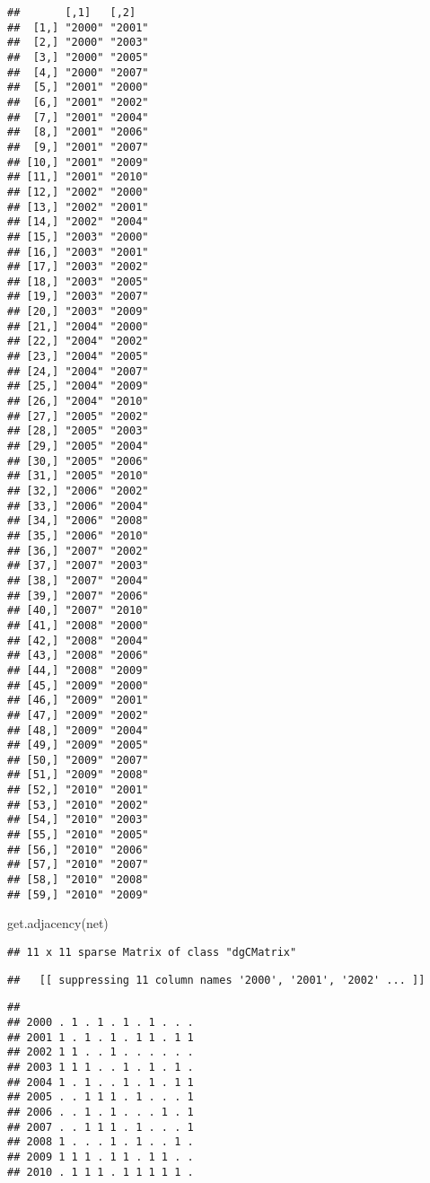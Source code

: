 \documentclass[
]{article}
\newenvironment{Shaded}{\begin{snugshade}}{\end{snugshade}}
\newcommand{\FunctionTok}[1]{\textcolor[rgb]{0.00,0.00,0.00}{#1}}
\newcommand{\NormalTok}[1]{#1}
\begin{document}
\begin{verbatim}
##       [,1]   [,2]  
##  [1,] "2000" "2001"
##  [2,] "2000" "2003"
##  [3,] "2000" "2005"
##  [4,] "2000" "2007"
##  [5,] "2001" "2000"
##  [6,] "2001" "2002"
##  [7,] "2001" "2004"
##  [8,] "2001" "2006"
##  [9,] "2001" "2007"
## [10,] "2001" "2009"
## [11,] "2001" "2010"
## [12,] "2002" "2000"
## [13,] "2002" "2001"
## [14,] "2002" "2004"
## [15,] "2003" "2000"
## [16,] "2003" "2001"
## [17,] "2003" "2002"
## [18,] "2003" "2005"
## [19,] "2003" "2007"
## [20,] "2003" "2009"
## [21,] "2004" "2000"
## [22,] "2004" "2002"
## [23,] "2004" "2005"
## [24,] "2004" "2007"
## [25,] "2004" "2009"
## [26,] "2004" "2010"
## [27,] "2005" "2002"
## [28,] "2005" "2003"
## [29,] "2005" "2004"
## [30,] "2005" "2006"
## [31,] "2005" "2010"
## [32,] "2006" "2002"
## [33,] "2006" "2004"
## [34,] "2006" "2008"
## [35,] "2006" "2010"
## [36,] "2007" "2002"
## [37,] "2007" "2003"
## [38,] "2007" "2004"
## [39,] "2007" "2006"
## [40,] "2007" "2010"
## [41,] "2008" "2000"
## [42,] "2008" "2004"
## [43,] "2008" "2006"
## [44,] "2008" "2009"
## [45,] "2009" "2000"
## [46,] "2009" "2001"
## [47,] "2009" "2002"
## [48,] "2009" "2004"
## [49,] "2009" "2005"
## [50,] "2009" "2007"
## [51,] "2009" "2008"
## [52,] "2010" "2001"
## [53,] "2010" "2002"
## [54,] "2010" "2003"
## [55,] "2010" "2005"
## [56,] "2010" "2006"
## [57,] "2010" "2007"
## [58,] "2010" "2008"
## [59,] "2010" "2009"
\end{verbatim}

\begin{Shaded}
\begin{Highlighting}[]
\FunctionTok{get.adjacency}\NormalTok{(net)}
\end{Highlighting}
\end{Shaded}

\begin{verbatim}
## 11 x 11 sparse Matrix of class "dgCMatrix"
\end{verbatim}

\begin{verbatim}
##   [[ suppressing 11 column names '2000', '2001', '2002' ... ]]
\end{verbatim}

\begin{verbatim}
##                           
## 2000 . 1 . 1 . 1 . 1 . . .
## 2001 1 . 1 . 1 . 1 1 . 1 1
## 2002 1 1 . . 1 . . . . . .
## 2003 1 1 1 . . 1 . 1 . 1 .
## 2004 1 . 1 . . 1 . 1 . 1 1
## 2005 . . 1 1 1 . 1 . . . 1
## 2006 . . 1 . 1 . . . 1 . 1
## 2007 . . 1 1 1 . 1 . . . 1
## 2008 1 . . . 1 . 1 . . 1 .
## 2009 1 1 1 . 1 1 . 1 1 . .
## 2010 . 1 1 1 . 1 1 1 1 1 .
\end{verbatim}
\end{document}

